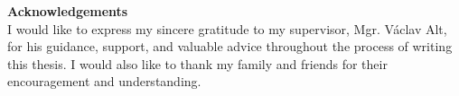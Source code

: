 \newpage
\pagestyle{empty}

\noindent
{\large\bfseries Acknowledgements}\\

\noindent
I would like to express my sincere gratitude to my supervisor, Mgr. Václav Alt, for his guidance, support, and valuable advice throughout the process of writing this thesis. I would also like to thank my family and friends for their encouragement and understanding.

